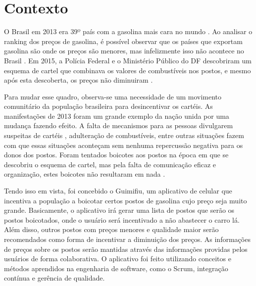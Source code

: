 \section{Contexto}
 
O Brasil em 2013 era 39º país com a gasolina mais cara no mundo \cite{oglobo}. Ao analisar o ranking dos preços de gasolina, é possível observar que os países que exportam gasolina são onde os preços são menores, mas infelizmente isso não acontece no Brasil \cite{ranking-precos}. Em 2015, a Polícia Federal e o Ministério Público do DF descobriram um esquema de cartel que combinava os valores de combustíveis nos postos, e mesmo após esta descoberta, os preços não diminuiram \cite{correio-cartel}. 

Para mudar esse quadro, observa-se uma necessidade de um movimento comunitário da população brasileira para desincentivar os cartéis. As manifestações de 2013 foram um grande exemplo da nação unida por uma mudança fazendo efeito. A falta de mecanismos para as pessoas divulgarem suspeitas de cartéis \cite{manifestacoes-2013}, adulteração de combustíveis, entre outras situações fazem com que essas situações aconteçam sem nenhuma repercussão negativa para os donos dos postos. Foram tentados boicotes aos postos na época em que se descobriu o esquema de cartel, mas pela falta de comunicação eficaz e organização, estes boicotes não resultaram em nada \cite{boicotes-2016}.

Tendo isso em vista, foi concebido o Guimifiu, um aplicativo de celular que incentiva a população a boicotar certos postos de gasolina cujo preço seja muito grande. Basicamente, o aplicativo irá gerar uma lista de postos que serão os postos boicotados, onde o usuário será incentivado a não abastecer o carro lá. Além disso, outros postos com preços menores e qualidade maior serão recomendados como forma de incentivar a diminuição dos preços. As informações de preços sobre os postos serão mantidas através das informações providas pelos usuários de forma colaborativa. O aplicativo foi feito utilizando conceitos e métodos aprendidos na engenharia de software, como o Scrum, integração contínua e gerência de qualidade.
